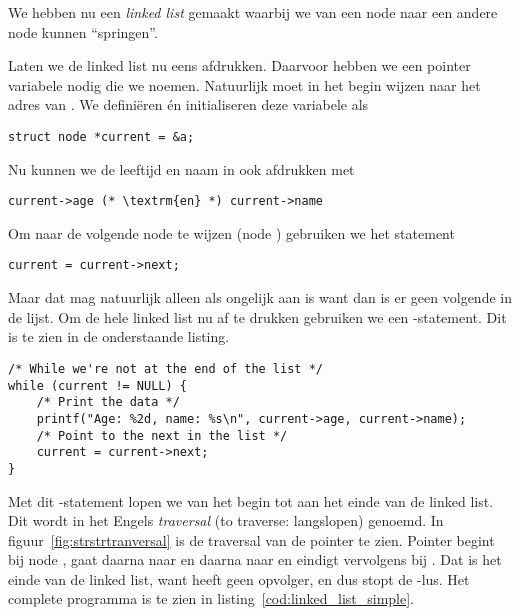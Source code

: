 We hebben nu een \textsl{linked list} gemaakt waarbij we van een node naar een andere node kunnen ``springen''.

Laten we de linked list nu eens afdrukken. Daarvoor hebben we een pointer variabele nodig die we  noemen. Natuurlijk moet  in het begin wijzen naar het adres van . We definiëren én initialiseren deze variabele als

\begin{lstlisting}[style=lstoneline]
struct node *current = &a;
\end{lstlisting}

Nu kunnen we de leeftijd en naam in  ook afdrukken met

\begin{lstlisting}[style=lstoneline]
current->age (* \textrm{en} *) current->name
\end{lstlisting}

Om naar de volgende node te wijzen (node ) gebruiken we het statement

\begin{lstlisting}[style=lstoneline]
current = current->next;
\end{lstlisting}

Maar dat mag natuurlijk alleen als  ongelijk aan  is want dan is er geen volgende in de lijst. Om de hele linked list nu af te drukken gebruiken we een -statement. Dit is te zien in de onderstaande listing.

\begin{lstlisting}[style=lstoneline]
/* While we're not at the end of the list */
while (current != NULL) {
    /* Print the data */
	printf("Age: %2d, name: %s\n", current->age, current->name);
    /* Point to the next in the list */
	current = current->next;
}
\end{lstlisting}

Met dit -statement lopen we van het begin tot aan het einde van de linked list. Dit wordt in het Engels \textsl{traversal} (to traverse: langslopen) genoemd. In figuur~\ref{fig:strstrtranversal} is de traversal van de pointer  te zien. Pointer  begint bij node , gaat daarna naar  en daarna naar  en eindigt vervolgens bij . Dat is het einde van de linked list, want  heeft geen opvolger, en dus stopt de -lus.
Het complete programma is te zien in listing~\ref{cod:linked_list_simple}.

